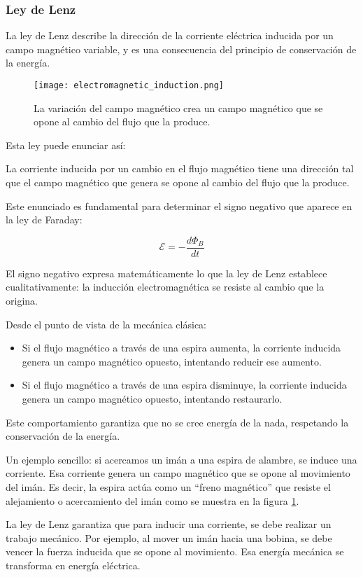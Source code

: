 \subsubsection{Ley de Lenz}
\label{sec:ley_de_lenz}

La ley de Lenz describe la dirección de la corriente eléctrica inducida por un campo magnético variable, y es una consecuencia del principio de conservación de la energía.

\begin{figure}[ht]
  \centering
  \texttt{[image: electromagnetic\_induction.png]}
  \caption{La variación del campo magnético crea un campo magnético que se opone al cambio del flujo que la produce.}
  \label{fig:electromagnetic_induction}
\end{figure}

Esta ley puede enunciar así:

\begin{tcolorbox}[myconclusion]
  La corriente inducida por un cambio en el flujo magnético tiene una dirección tal que el campo magnético que genera se opone al cambio del flujo que la produce.
\end{tcolorbox}

Este enunciado es fundamental para determinar el signo negativo que aparece en la ley de Faraday:

$$
\mathcal{E} = -\frac{d\Phi_B}{dt}
$$

El signo negativo expresa matemáticamente lo que la ley de Lenz establece cualitativamente: la inducción electromagnética se resiste al cambio que la origina.

Desde el punto de vista de la mecánica clásica:
\begin{itemize}
  \item Si el flujo magnético a través de una espira aumenta, la corriente inducida genera un campo magnético opuesto, intentando reducir ese aumento.
  \item Si el flujo magnético a través de una espira disminuye, la corriente inducida genera un campo magnético opuesto, intentando restaurarlo.
\end{itemize}

Este comportamiento garantiza que no se cree energía de la nada, respetando la conservación de la energía.

Un ejemplo sencillo: si acercamos un imán a una espira de alambre, se induce una corriente. Esa corriente genera un campo magnético que se opone al movimiento del imán. Es decir, la espira actúa como un ``freno magnético'' que resiste el alejamiento o acercamiento del imán como se muestra en la figura \ref{fig:electromagnetic_induction}.

La ley de Lenz garantiza que para inducir una corriente, se debe realizar un trabajo mecánico. Por ejemplo, al mover un imán hacia una bobina, se debe vencer la fuerza inducida que se opone al movimiento. Esa energía mecánica se transforma en energía eléctrica.